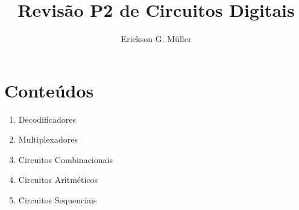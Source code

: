 \documentclass[•]{article}
\title{Revisão P2 de Circuitos Digitais}
\author{Erickson G. Müller}
\begin{document}
	\maketitle
	
	\section{Conteúdos}
		\begin{enumerate}
			\item Decodificadores
			\item Multiplexadores
			\item Circuitos Combinacionais
			\item Circuitos Aritméticos
			\item Circuitos Sequenciais
		\end{enumerate}
\end{document}
